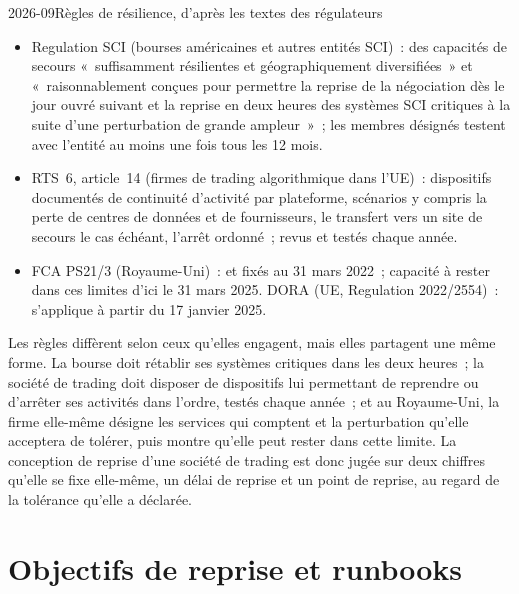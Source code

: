 \begin{dated}{2026-09}{Règles de résilience, d'après les textes des régulateurs}\label{dat:nw:disaster-recovery-and-regulatory-requirements:rules}
\begin{itemize}
\item Regulation SCI (bourses américaines et autres entités SCI)~: des capacités de secours «~suffisamment résilientes et géographiquement diversifiées~»
  et «~raisonnablement conçues pour permettre la reprise de la négociation dès le jour ouvré suivant et la reprise en deux heures des systèmes SCI critiques
  à la suite d'une perturbation de grande ampleur~»~; les membres désignés testent avec l'entité au moins une fois tous les 12 mois.
\item RTS~6, article~14 (firmes de trading algorithmique dans l'UE)~: dispositifs documentés de continuité d'activité par plateforme, scénarios
  y compris la perte de centres de données et de fournisseurs, le transfert vers un site de secours le cas échéant, l'arrêt ordonné~; revus et
  testés chaque année.
\item FCA PS21/3 (Royaume-Uni)~:  et  fixés au 31 mars 2022~; capacité à rester dans ces limites d'ici le
  31 mars 2025. DORA (UE, Regulation 2022/2554)~: s'applique à partir du 17 janvier 2025.
\end{itemize}
\end{dated}

Les règles diffèrent selon ceux qu'elles engagent, mais elles partagent une même forme. La bourse doit rétablir ses systèmes critiques dans les deux heures~; la société de trading
doit disposer de dispositifs lui permettant de reprendre ou d'arrêter ses activités dans l'ordre, testés chaque année~; et au Royaume-Uni, la firme elle-même désigne les
services qui comptent et la perturbation qu'elle acceptera de tolérer, puis montre qu'elle peut rester dans cette limite. La conception de reprise d'une société de trading est
donc jugée sur deux chiffres qu'elle se fixe elle-même, un délai de reprise et un point de reprise, au regard de la tolérance qu'elle a déclarée.

\section{Objectifs de reprise et runbooks}

